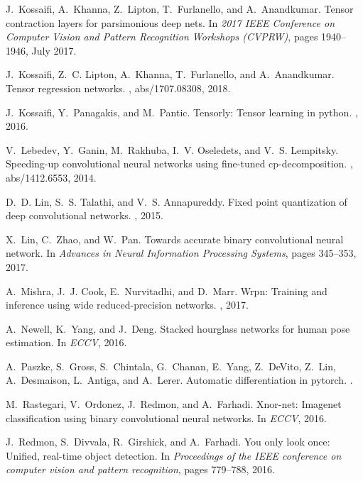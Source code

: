 \documentclass[10pt,twocolumn,letterpaper]{article}
\begin{document}
{\begin{thebibliography}{10}
J.~Kossaifi, A.~Khanna, Z.~Lipton, T.~Furlanello, and A.~Anandkumar.
\newblock Tensor contraction layers for parsimonious deep nets.
\newblock In {\em 2017 IEEE Conference on Computer Vision and Pattern
  Recognition Workshops (CVPRW)}, pages 1940--1946, July 2017.

J.~Kossaifi, Z.~C. Lipton, A.~Khanna, T.~Furlanello, and A.~Anandkumar.
\newblock Tensor regression networks.
, abs/1707.08308, 2018.

J.~Kossaifi, Y.~Panagakis, and M.~Pantic.
\newblock Tensorly: Tensor learning in python.
, 2016.

V.~Lebedev, Y.~Ganin, M.~Rakhuba, I.~V. Oseledets, and V.~S. Lempitsky.
\newblock Speeding-up convolutional neural networks using fine-tuned
  cp-decomposition.
, abs/1412.6553, 2014.

D.~D. Lin, S.~S. Talathi, and V.~S. Annapureddy.
\newblock Fixed point quantization of deep convolutional networks.
, 2015.

X.~Lin, C.~Zhao, and W.~Pan.
\newblock Towards accurate binary convolutional neural network.
\newblock In {\em Advances in Neural Information Processing Systems}, pages
  345--353, 2017.

A.~Mishra, J.~J. Cook, E.~Nurvitadhi, and D.~Marr.
\newblock Wrpn: Training and inference using wide reduced-precision networks.
, 2017.

A.~Newell, K.~Yang, and J.~Deng.
\newblock Stacked hourglass networks for human pose estimation.
\newblock In {\em ECCV}, 2016.

A.~Paszke, S.~Gross, S.~Chintala, G.~Chanan, E.~Yang, Z.~DeVito, Z.~Lin,
  A.~Desmaison, L.~Antiga, and A.~Lerer.
\newblock Automatic differentiation in pytorch.
.

M.~Rastegari, V.~Ordonez, J.~Redmon, and A.~Farhadi.
\newblock Xnor-net: Imagenet classification using binary convolutional neural
  networks.
\newblock In {\em ECCV}, 2016.

J.~Redmon, S.~Divvala, R.~Girshick, and A.~Farhadi.
\newblock You only look once: Unified, real-time object detection.
\newblock In {\em Proceedings of the IEEE conference on computer vision and
  pattern recognition}, pages 779--788, 2016.


\end{thebibliography}}
\end{document}
